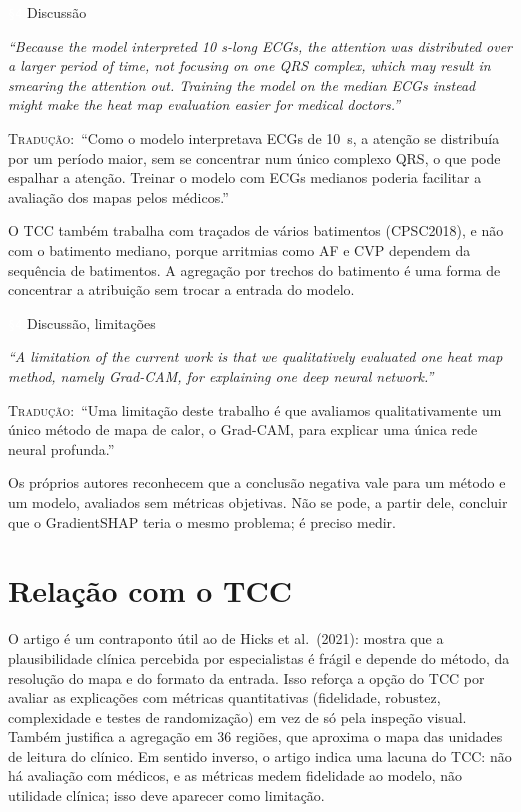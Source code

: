 \documentclass[11pt,a4paper]{article}
\newcommand{\pagechip}[1]{{\setlength{\fboxsep}{1.5pt}\colorbox{cAcc}{\textcolor{white}{\scriptsize\texttt{#1}}}}}
\newenvironment{origquote}{\par\itshape\small}{\par}
\newenvironment{tradquote}{\par\small\textsc{Tradução:}\ }{\par}
\newcommand{\explab}[1]{\par\smallskip{\small\color{cAcc}\textbf{\MakeUppercase{#1}}}\par}
\begin{document}
\begin{citacard}{\pagechip{§4} Discussão}
\begin{origquote}“Because the model interpreted 10 s-long ECGs, the attention was distributed over a larger period of time, not focusing on one QRS complex, which may result in smearing the attention out. Training the model on the median ECGs instead might make the heat map evaluation easier for medical doctors.”\end{origquote}
\begin{tradquote}“Como o modelo interpretava ECGs de 10~s, a atenção se distribuía por um período maior, sem se concentrar num único complexo QRS, o que pode espalhar a atenção. Treinar o modelo com ECGs medianos poderia facilitar a avaliação dos mapas pelos médicos.”\end{tradquote}
\explab{Explicação}
O TCC também trabalha com traçados de vários batimentos (CPSC2018), e não com o batimento mediano, porque arritmias como AF e CVP dependem da sequência de batimentos. A agregação por trechos do batimento é uma forma de concentrar a atribuição sem trocar a entrada do modelo.
\end{citacard}

\begin{citacard}{\pagechip{§4} Discussão, limitações}
\begin{origquote}“A limitation of the current work is that we qualitatively evaluated one heat map method, namely Grad-CAM, for explaining one deep neural network.”\end{origquote}
\begin{tradquote}“Uma limitação deste trabalho é que avaliamos qualitativamente um único método de mapa de calor, o Grad-CAM, para explicar uma única rede neural profunda.”\end{tradquote}
\explab{Explicação}
Os próprios autores reconhecem que a conclusão negativa vale para um método e um modelo, avaliados sem métricas objetivas. Não se pode, a partir dele, concluir que o GradientSHAP teria o mesmo problema; é preciso medir.
\end{citacard}

\section{Relação com o TCC}
O artigo é um contraponto útil ao de Hicks et al.\ (2021): mostra que a plausibilidade clínica percebida por especialistas é frágil e depende do método, da resolução do mapa e do formato da entrada. Isso reforça a opção do TCC por avaliar as explicações com métricas quantitativas (fidelidade, robustez, complexidade e testes de randomização) em vez de só pela inspeção visual. Também justifica a agregação em 36 regiões, que aproxima o mapa das unidades de leitura do clínico. Em sentido inverso, o artigo indica uma lacuna do TCC: não há avaliação com médicos, e as métricas medem fidelidade ao modelo, não utilidade clínica; isso deve aparecer como limitação.
\end{document}
